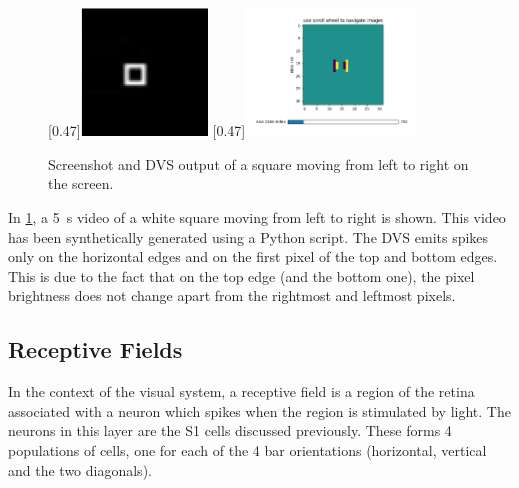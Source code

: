\begin{figure}[ht]
\centering
{}
  [0.47\textwidth]{\includegraphics[width=0.30\textwidth]{images/development/dvs_square_lr.png}}
  [0.47\textwidth]{\includegraphics[width=0.4\textwidth]{images/development/spikes_square_lr.png}}
\caption[DVS Output of a Square]{Screenshot and DVS output of a square moving from left to right on the screen.}
\label{fig:square_lr}
\end{figure}

In \cref{fig:square_lr}, a \SI{5}{s} video of a white square moving from left to right is shown. This video has been synthetically generated using a Python script. The DVS emits spikes only on the horizontal edges and on the first pixel of the top and bottom edges. This is due to the fact that on the top edge (and the bottom one), the pixel brightness does not change apart from the rightmost and leftmost pixels.

\subsection{Receptive Fields}
In the context of the visual system, a receptive field is a region of the retina associated with a neuron which spikes when the region is stimulated by light. The neurons in this layer are the \textsc{S1} cells discussed previously. These forms 4 populations of cells, one for each of the 4 bar orientations (horizontal, vertical and the two diagonals). 

